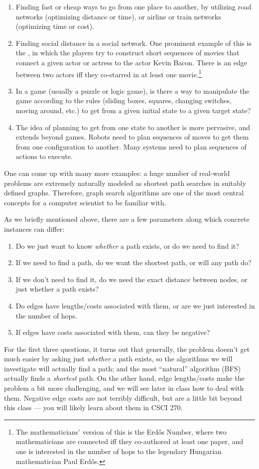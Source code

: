 \begin{enumerate}
\item Finding fast or cheap ways to go from one place to another, by
  utilizing road networks (optimizing distance or time), or airline or
  train networks (optimizing time or cost).
\item Finding social distance in a social network. One prominent
  example of this is the , in which the players
  try to construct short sequences of movies that connect a given
  actor or actress to the actor Kevin Bacon. There is an edge between
  two actors iff they co-starred in at least one movie.\footnote{The
    mathematicians' version of this is the Erd\H{o}s Number, where two
    mathematicians are connected iff they co-authored at least one
    paper, and one is interested in the number of hops to the
    legendary Hungarian mathematician Paul Erd\H{o}s.}
\item In a game (usually a puzzle or logic game), is there a way to
  manipulate the game according to the rules (sliding boxes, squares,
  changing switches, moving around, etc.) to get from a given initial
  state to a given target state?
\item The idea of planning to get from one state to another is more
  pervasive, and extends beyond games. Robots need to plan sequences
  of moves to get them from one configuration to another. Many systems
  need to plan sequences of actions to execute.
\end{enumerate}

One can come up with many more examples: a huge number of real-world
problems are extremely naturally modeled as shortest path searches in
suitably defined graphs. Therefore, graph search algorithms are one of
the most central concepts for a computer scientist to be familiar
with.

As we briefly mentioned above, there are a few parameters along which
concrete instances can differ:
\begin{enumerate}
\item Do we just want to know \emph{whether} a path exists, or do we
  need to find it? 
\item If we need to find a path, do we want the shortest path, or will
  any path do?
\item If we don't need to find it, do we need the exact distance
  between nodes, or just whether a path exists?
\item Do edges have lengths/costs associated with them, or are we just
  interested in the number of hops.
\item If edges have costs associated with them, can they be negative?
\end{enumerate}
For the first three questions, it turns out that generally, the
problem doesn't get much easier by asking just \emph{whether} a path
exists, so the algorithms we will investigate will actually find a
path; and the most ``natural'' algorithm (BFS) actually finds a
\emph{shortest} path. On the other hand, edge lengths/costs make the
problem a bit more challenging, and we will see later in class how to
deal with them. Negative edge costs are not terribly difficult, but
are a little bit beyond this class --- you will likely learn about
them in CSCI 270.

